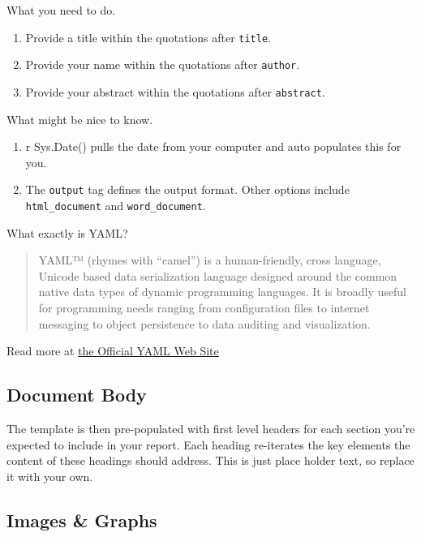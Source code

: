 \documentclass[
]{book}
\providecommand{\tightlist}{%
  \setlength{\itemsep}{0pt}\setlength{\parskip}{0pt}}
\begin{document}
What you need to do.

\begin{enumerate}
\def\labelenumi{\arabic{enumi}.}
\tightlist
\item
  Provide a title within the quotations after \texttt{title}.
\item
  Provide your name within the quotations after \texttt{author}.
\item
  Provide your abstract within the quotations after \texttt{abstract}.
\end{enumerate}

What might be nice to know.

\begin{enumerate}
\def\labelenumi{\arabic{enumi}.}
\tightlist
\item
  r Sys.Date() pulls the date from your computer and auto populates this for you.
\item
  The \texttt{output} tag defines the output format. Other options include \texttt{html\_document} and \texttt{word\_document}.
\end{enumerate}

What exactly is YAML?

\begin{quote}
YAML™ (rhymes with ``camel'') is a human-friendly, cross language, Unicode based data serialization language designed around the common native data types of dynamic programming languages. It is broadly useful for programming needs ranging from configuration files to internet messaging to object persistence to data auditing and visualization.
\end{quote}

Read more at \href{https://yaml.org/}{the Official YAML Web Site}

\hypertarget{document-body}{%
\subsection*{Document Body}\label{document-body}}

The template is then pre-populated with first level headers for each section you're expected to include in your report. Each heading re-iterates the key elements the content of these headings should address. This is just place holder text, so replace it with your own.

\hypertarget{images-graphs}{%
\subsection*{Images \& Graphs}\label{images-graphs}}
\end{document}
